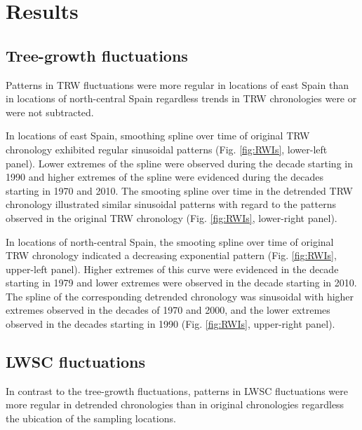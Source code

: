 \documentclass[review,authoryear]{elsarticle}
\begin{document}

\section{Results}
\subsection{Tree-growth fluctuations}
Patterns in \gls{TRW} fluctuations were more regular in locations
of east Spain than in locations of north-central Spain regardless
trends in \gls{TRW} chronologies were or were not subtracted.

In locations of east Spain, smoothing spline over time of original
\gls{TRW} chronology exhibited regular sinusoidal patterns
(Fig. \ref{fig:RWIs}, lower-left panel). Lower extremes of the spline
were observed during the decade starting in 1990 and higher extremes
of the spline were evidenced during the decades starting in 1970 and
2010. The smooting spline over time in the detrended \gls{TRW}
chronology illustrated similar sinusoidal patterns with regard to the
patterns observed in the original \gls{TRW} chronology
(Fig. \ref{fig:RWIs}, lower-right panel).

In locations of north-central Spain, the smooting spline over time of
original \gls{TRW} chronology indicated a decreasing exponential
pattern (Fig. \ref{fig:RWIs}, upper-left panel). Higher extremes of
this curve were evidenced in the decade starting in 1979 and lower
extremes were observed in the decade starting in 2010. The spline of
the corresponding detrended chronology was sinusoidal with higher
extremes observed in the decades of 1970 and 2000, and the lower
extremes observed in the decades starting in 1990
(Fig. \ref{fig:RWIs}, upper-right panel).

\subsection{\acrlong{LWSC} fluctuations}
In contrast to the tree-growth fluctuations, patterns in \acrfull{LWSC}
fluctuations were more regular in detrended chronologies than in
original chronologies regardless the ubication of the sampling
locations.
\end{document}

